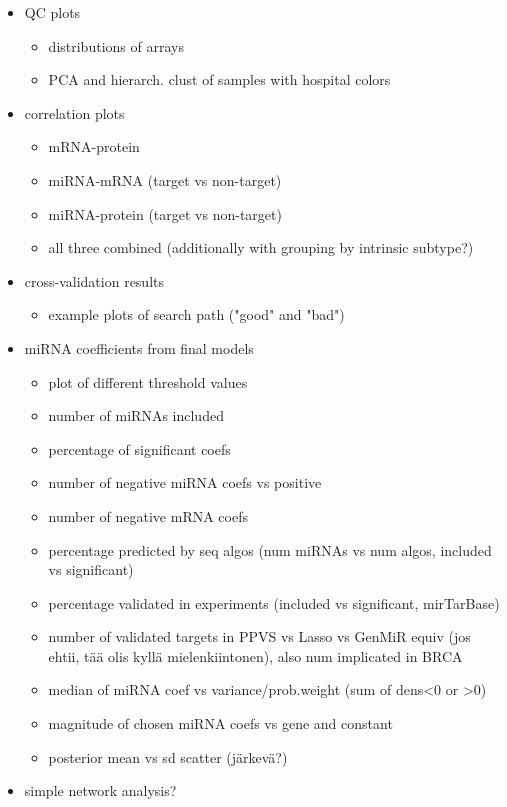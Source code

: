 \begin{itemize}
  \item QC plots
  \begin{itemize}
    \item distributions of arrays
    \item PCA and hierarch. clust of samples with hospital colors
  \end{itemize}
  \item correlation plots
  \begin{itemize}
    \item mRNA-protein
    \item miRNA-mRNA (target vs non-target)
    \item miRNA-protein (target vs non-target)
    \item all three combined (additionally with grouping by intrinsic subtype?)
  \end{itemize}
  \item cross-validation results
  \begin{itemize}
    \item example plots of search path ("good" and "bad")
  \end{itemize}
  \item miRNA coefficients from final models
  \begin{itemize}
  	\item plot of different threshold values
    \item number of miRNAs included
    \item percentage of significant coefs
    \item number of negative miRNA coefs vs positive
    \item number of negative mRNA coefs
    \item percentage predicted by seq algos (num miRNAs vs num algos, included vs significant)
    \item percentage validated in experiments (included vs significant, mirTarBase)
    \item number of validated targets in PPVS vs Lasso vs GenMiR equiv (jos ehtii, tää olis kyllä mielenkiintonen), also num implicated in BRCA
    \item median of miRNA coef vs variance/prob.weight (sum of dens<0 or >0)
    \item magnitude of chosen miRNA coefs vs gene and constant
    \item posterior mean vs sd scatter (järkevä?)
  \end{itemize}
  \item simple network analysis?

\end{itemize}
